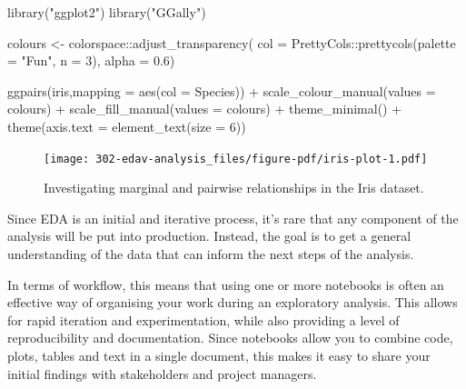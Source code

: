 \documentclass[
  letterpaper,
  DIV=11,
  numbers=noendperiod]{scrreprt}
\newenvironment{Shaded}{\begin{snugshade}}{\end{snugshade}}
\newcommand{\AttributeTok}[1]{\textcolor[rgb]{0.40,0.45,0.13}{#1}}
\newcommand{\DecValTok}[1]{\textcolor[rgb]{0.68,0.00,0.00}{#1}}
\newcommand{\FloatTok}[1]{\textcolor[rgb]{0.68,0.00,0.00}{#1}}
\newcommand{\FunctionTok}[1]{\textcolor[rgb]{0.28,0.35,0.67}{#1}}
\newcommand{\NormalTok}[1]{\textcolor[rgb]{0.00,0.23,0.31}{#1}}
\newcommand{\OtherTok}[1]{\textcolor[rgb]{0.00,0.23,0.31}{#1}}
\newcommand{\SpecialCharTok}[1]{\textcolor[rgb]{0.37,0.37,0.37}{#1}}
\newcommand{\StringTok}[1]{\textcolor[rgb]{0.13,0.47,0.30}{#1}}
\begin{document}
\begin{Shaded}
\begin{Highlighting}[]
\FunctionTok{library}\NormalTok{(}\StringTok{"ggplot2"}\NormalTok{)                     }
\FunctionTok{library}\NormalTok{(}\StringTok{"GGally"}\NormalTok{)}

\NormalTok{colours }\OtherTok{\textless{}{-}}\NormalTok{ colorspace}\SpecialCharTok{::}\FunctionTok{adjust\_transparency}\NormalTok{(}
  \AttributeTok{col =}\NormalTok{ PrettyCols}\SpecialCharTok{::}\FunctionTok{prettycols}\NormalTok{(}\AttributeTok{palette =} \StringTok{"Fun"}\NormalTok{, }\AttributeTok{n =} \DecValTok{3}\NormalTok{),}
  \AttributeTok{alpha =} \FloatTok{0.6}\NormalTok{)}

\FunctionTok{ggpairs}\NormalTok{(iris,}\AttributeTok{mapping =} \FunctionTok{aes}\NormalTok{(}\AttributeTok{col =}\NormalTok{ Species)) }\SpecialCharTok{+}
  \FunctionTok{scale\_colour\_manual}\NormalTok{(}\AttributeTok{values =}\NormalTok{ colours) }\SpecialCharTok{+}
  \FunctionTok{scale\_fill\_manual}\NormalTok{(}\AttributeTok{values =}\NormalTok{ colours) }\SpecialCharTok{+}
  \FunctionTok{theme\_minimal}\NormalTok{() }\SpecialCharTok{+} 
  \FunctionTok{theme}\NormalTok{(}\AttributeTok{axis.text =} \FunctionTok{element\_text}\NormalTok{(}\AttributeTok{size =} \DecValTok{6}\NormalTok{))}
\end{Highlighting}
\end{Shaded}

\begin{figure}[H]

{\centering \texttt{[image: 302-edav-analysis\_files/figure-pdf/iris-plot-1.pdf]}

}

\caption{Investigating marginal and pairwise relationships in the Iris
dataset.}

\end{figure}%

Since EDA is an initial and iterative process, it's rare that any
component of the analysis will be put into production. Instead, the goal
is to get a general understanding of the data that can inform the next
steps of the analysis.

In terms of workflow, this means that using one or more notebooks is
often an effective way of organising your work during an exploratory
analysis. This allows for rapid iteration and experimentation, while
also providing a level of reproducibility and documentation. Since
notebooks allow you to combine code, plots, tables and text in a single
document, this makes it easy to share your initial findings with
stakeholders and project managers.
\end{document}
